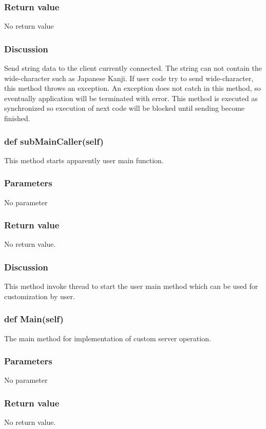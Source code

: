 \documentclass[a4paper,10pt]{jsarticle}
\begin{document}
\subsubsection*{Return value}
No return value

\subsubsection*{Discussion}
Send string data to the client currently connected.
The string can not contain the wide-character such as Japanese Kanji.
If user code try to send wide-character, this method throws an exception.
An exception does not catch in this method, so eventually application will be terminated with error.
This method is executed as synchronized so execution of next code will be blocked until sending become finished.

\subsubsection{def subMainCaller(self)}
This method starts apparently user main function.

\subsubsection*{Parameters}
No parameter

\subsubsection*{Return value}
No return value.

\subsubsection*{Discussion}
This method invoke thread to start the user main method which can be used for customization by user.

\subsubsection{def Main(self)}
The main method for implementation of custom server operation.

\subsubsection*{Parameters}
No parameter

\subsubsection*{Return value}
No return value.
\end{document}
